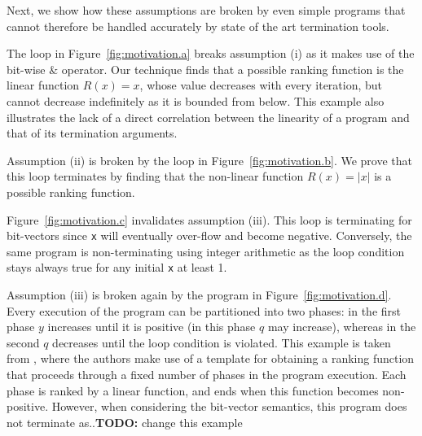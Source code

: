 \documentclass[preprint]{sigplanconf}
\theoremstyle{definition}
\newcommand{\todo}[1]{{\bf TODO:} #1}
\begin{document}
Next, we show how these assumptions are broken by even simple programs that cannot therefore be handled accurately by state of the art termination tools.



The loop in Figure~\ref{fig:motivation.a} breaks assumption (i) as it makes use of the bit-wise $\&$ operator.
Our technique finds that a possible ranking function is the linear function
$R(x) = x$, whose value decreases with
every iteration, but cannot decrease indefinitely as it is bounded from below.
This example also illustrates the lack of a direct correlation between the linearity of a program and that of its termination arguments.

Assumption (ii) is broken by the loop in Figure~\ref{fig:motivation.b}.
We prove that this loop terminates by finding that the non-linear function $R(x) = |x|$ is a possible ranking function.

Figure~\ref{fig:motivation.c} invalidates assumption (iii). 
This loop is  terminating for bit-vectors since \texttt{x}
will eventually over-flow and become negative. Conversely, the same program is non-terminating using integer
arithmetic as the loop condition stays always true for any initial \texttt{x} at least 1.

Assumption (iii) is broken again by the program in Figure~\ref{fig:motivation.d}. Every execution of the program can be partitioned into two phases: 
in the first phase $y$ increases until it is positive (in this phase $q$ may increase), whereas in the second $q$ decreases until the loop condition is violated. 
This example is taken from \cite{DBLP:conf/tacas/LeikeH14}, where the authors make use of a template for obtaining a ranking function that proceeds
through a fixed number of phases in the program execution. Each phase is ranked by a linear function, and ends when this function becomes non-positive.
However, when considering the bit-vector semantics, this program does not terminate as..\todo{change this example}
\end{document}
